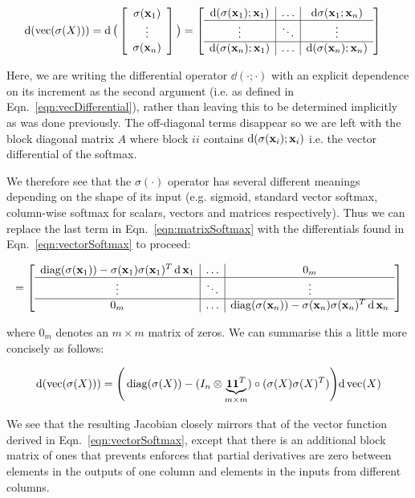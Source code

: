 \begin{align}
  \operatorname{\text{d}}(\operatorname{vec}(\sigma(X))) &= \operatorname{\text{d}} \big( \left[\begin{array}{c}
  \sigma(\mathbf{x}_1) \\
  \vdots \\
  \sigma(\mathbf{x}_n)
\end{array}\right] \big) =
\left[\begin{array}{c|c|c}
  \operatorname{\text{d}} (\sigma(\mathbf{x}_1); \mathbf{x}_1) & \hdots & {\operatorname{\text{d}}} \sigma(\mathbf{x}_1; \mathbf{x}_n) \\
  \hline
  \vdots & \ddots & \vdots \\
  \hline  
  \operatorname{\text{d}} (\sigma(\mathbf{x}_n); \mathbf{x}_1) & \hdots & \operatorname{\text{d}}(\sigma(\mathbf{x}_n); \mathbf{x}_n) \\
\end{array}\right] \label{eqn:matrixSoftmax}
\end{align}

Here, we are writing the differential operator $\dd(\cdot ; \cdot)$ with an explicit dependence on its increment as the second argument (i.e. as defined in Eqn.~\ref{eqn:vecDifferential}), rather than leaving this to be determined implicitly as was done previously.  The off-diagonal terms disappear so we are left with the block diagonal matrix $A$ where block $ii$ contains $\operatorname{\text{d}}(\sigma(\mathbf{x}_i); \mathbf{x}_i)$ i.e. the vector differential of the softmax. 

We therefore see that the $\sigma(\cdot)$ operator has several different meanings depending on the shape of its input (e.g. sigmoid, standard vector softmax, column-wise softmax for scalars, vectors and matrices respectively). Thus we can replace the last term in Eqn.~\ref{eqn:matrixSoftmax} with the differentials found in Eqn.~\ref{eqn:vectorSoftmax} to proceed:

\begin{align}
= \left[\begin{array}{c|c|c}
  \operatorname{diag}(\sigma(\mathbf{x}_1)) - \sigma(\mathbf{x}_1)\sigma(\mathbf{x}_1)^T \operatorname{\text{d}} \mathbf{x}_1 & \hdots & 0_m \\
  \hline
  \vdots & \ddots & \vdots \\
  \hline  
  0_m & \hdots & \operatorname{diag}(\sigma(\mathbf{x}_n)) - \sigma(\mathbf{x}_n)\sigma(\mathbf{x}_n)^T \operatorname{\text{d}} \mathbf{x}_n \\
\end{array}\right]  
\end{align}

where $0_m$ denotes an $m \times m$ matrix of zeros. We can summarise this a little more concisely as follows:

\begin{align}
  \operatorname{\text{d}}(\operatorname{vec}(\sigma(X))) = \Bigg(\operatorname{diag}(\sigma(X)) - (I_n \otimes \underbrace{\mathbf{1} \mathbf{1}^T}_{m \times m}) \circ (\sigma(X)\sigma(X)^T)\Bigg) {\operatorname{\text{d}}}\operatorname{vec}(X) \label{eqn:matrixSoftmaxDiff}
\end{align}

We see that the resulting Jacobian closely mirrors that of the vector function derived in Eqn.~\ref{eqn:vectorSoftmax}, except that there is an additional block matrix of ones that prevents enforces that partial derivatives are zero between elements in the outputs of one column and elements in the inputs from different columns.

